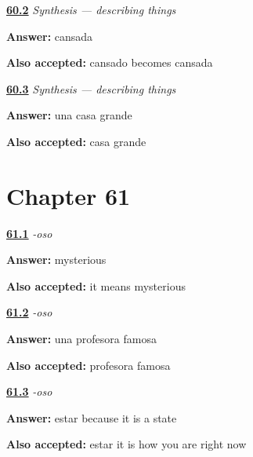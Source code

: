 \noindent\begin{minipage}[t]{\linewidth}
\raggedright
\hyperlink{review-ES-C09-sintesis-describir-shift}{\textbf{60.2}} \emph{Synthesis — describing things}\par
\small \textbf{Answer:} cansada\par
\footnotesize \textbf{Also accepted:} cansado becomes cansada
\end{minipage}\par\medskip

\noindent\begin{minipage}[t]{\linewidth}
\raggedright
\hyperlink{review-ES-C09-sintesis-describir-order}{\textbf{60.3}} \emph{Synthesis — describing things}\par
\small \textbf{Answer:} una casa grande\par
\footnotesize \textbf{Also accepted:} casa grande
\end{minipage}\par\medskip

\section*{Chapter 61}

\noindent\begin{minipage}[t]{\linewidth}
\raggedright
\hyperlink{review-ES-C09-oso-decode}{\textbf{61.1}} \emph{-oso}\par
\small \textbf{Answer:} mysterious\par
\footnotesize \textbf{Also accepted:} it means mysterious
\end{minipage}\par\medskip

\noindent\begin{minipage}[t]{\linewidth}
\raggedright
\hyperlink{review-ES-C09-oso-agree}{\textbf{61.2}} \emph{-oso}\par
\small \textbf{Answer:} una profesora famosa\par
\footnotesize \textbf{Also accepted:} profesora famosa
\end{minipage}\par\medskip

\noindent\begin{minipage}[t]{\linewidth}
\raggedright
\hyperlink{review-ES-C09-oso-verb}{\textbf{61.3}} \emph{-oso}\par
\small \textbf{Answer:} estar because it is a state\par
\footnotesize \textbf{Also accepted:} estar it is how you are right now
\end{minipage}\par\medskip


